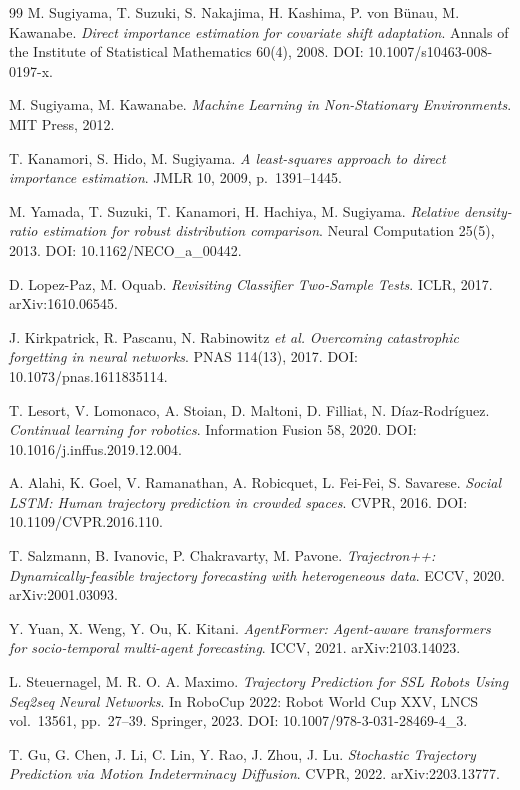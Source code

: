 \documentclass[11pt,a4paper]{article}
\begin{document}
\begin{thebibliography}{99}
M. Sugiyama, T. Suzuki, S. Nakajima, H. Kashima, P. von B\"{u}nau, M. Kawanabe.
\textit{Direct importance estimation for covariate shift adaptation}.
Annals of the Institute of Statistical Mathematics 60(4), 2008.
DOI: 10.1007/s10463-008-0197-x.

M. Sugiyama, M. Kawanabe.
\textit{Machine Learning in Non-Stationary Environments}.
MIT Press, 2012.

T. Kanamori, S. Hido, M. Sugiyama.
\textit{A least-squares approach to direct importance estimation}.
JMLR 10, 2009, p.~1391--1445.

M. Yamada, T. Suzuki, T. Kanamori, H. Hachiya, M. Sugiyama.
\textit{Relative density-ratio estimation for robust distribution comparison}.
Neural Computation 25(5), 2013. DOI: 10.1162/NECO\_a\_00442.

D. Lopez-Paz, M. Oquab.
\textit{Revisiting Classifier Two-Sample Tests}.
ICLR, 2017. arXiv:1610.06545.

J. Kirkpatrick, R. Pascanu, N. Rabinowitz \emph{et al.}
\textit{Overcoming catastrophic forgetting in neural networks}.
PNAS 114(13), 2017. DOI: 10.1073/pnas.1611835114.

T. Lesort, V. Lomonaco, A. Stoian, D. Maltoni, D. Filliat, N. D\'iaz-Rodr\'iguez.
\textit{Continual learning for robotics}.
Information Fusion 58, 2020. DOI: 10.1016/j.inffus.2019.12.004.

A. Alahi, K. Goel, V. Ramanathan, A. Robicquet, L. Fei-Fei, S. Savarese.
\textit{Social LSTM: Human trajectory prediction in crowded spaces}.
CVPR, 2016. DOI: 10.1109/CVPR.2016.110.

T. Salzmann, B. Ivanovic, P. Chakravarty, M. Pavone.
\textit{Trajectron++: Dynamically-feasible trajectory forecasting with
heterogeneous data}.
ECCV, 2020. arXiv:2001.03093.

Y. Yuan, X. Weng, Y. Ou, K. Kitani.
\textit{AgentFormer: Agent-aware transformers for socio-temporal
multi-agent forecasting}.
ICCV, 2021. arXiv:2103.14023.

L. Steuernagel, M. R. O. A. Maximo.
\textit{Trajectory Prediction for SSL Robots Using Seq2seq Neural Networks}.
In RoboCup 2022: Robot World Cup XXV, LNCS vol.~13561, pp.~27--39.
Springer, 2023. DOI: 10.1007/978-3-031-28469-4\_3.

T. Gu, G. Chen, J. Li, C. Lin, Y. Rao, J. Zhou, J. Lu.
\textit{Stochastic Trajectory Prediction via Motion Indeterminacy Diffusion}.
CVPR, 2022. arXiv:2203.13777.

\end{thebibliography}
\end{document}
